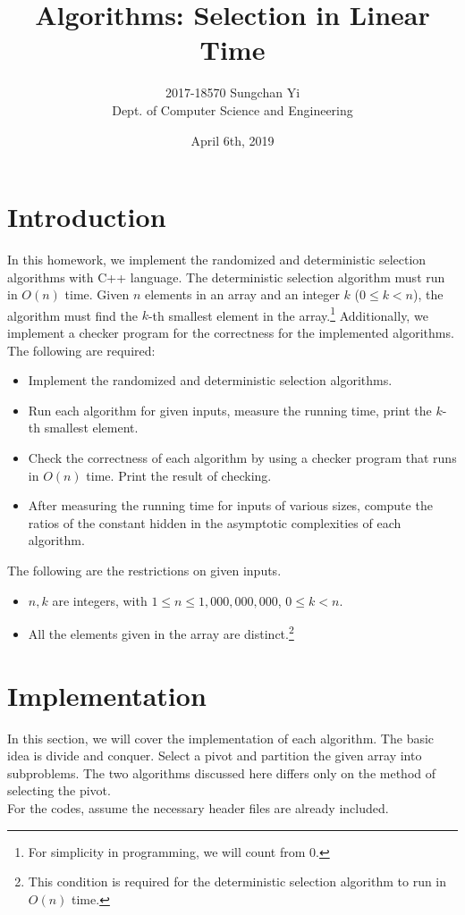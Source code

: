 \documentclass[12pt]{article}
\title{\sffamily Algorithms: Selection in Linear Time}
\author{2017-18570 Sungchan Yi\\Dept. of Computer Science and Engineering}
\date{April 6th, 2019}
\begin{document}
 

\maketitle
\tableofcontents

\section{Introduction}
In this homework, we implement the randomized and deterministic selection algorithms with C++ language. The deterministic selection algorithm must run in $O(n)$ time. Given $n$ elements in an array and an integer $k$ ($0\leq k < n$), the algorithm must find the $k$-th smallest element in the array.\footnote{For simplicity in programming, we will count from 0.} Additionally, we implement a checker program for the correctness for the implemented algorithms. The following are required:
\begin{itemize}
	\item Implement the randomized and deterministic selection algorithms.
	\item Run each algorithm for given inputs, measure the running time, print the $k$-th smallest element.
	\item Check the correctness of each algorithm by using a checker program that runs in $O(n)$ time. Print the result of checking.
	\item After measuring the running time for inputs of various sizes, compute the ratios of the constant hidden in the asymptotic complexities of each algorithm.
\end{itemize}
The following are the restrictions on given inputs.
\begin{itemize}
	\item $n, k$ are integers, with $1\leq n\leq 1,000,000,000$, $0\leq k < n$.
	\item All the elements given in the array are distinct.\footnote{This condition is required for the deterministic selection algorithm to run in $O(n)$ time.}
\end{itemize}

\section{Implementation}
In this section, we will cover the implementation of each algorithm. The basic idea is divide and conquer. Select a pivot and partition the given array into subproblems. The two algorithms discussed here differs only on the method of selecting the pivot.\\
For the codes, assume the necessary header files are already included.
\end{document}
